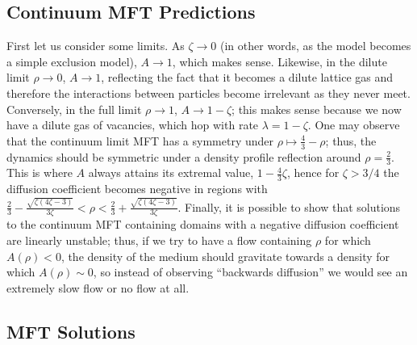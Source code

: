 \subsection{Continuum MFT Predictions} \label{sec:contMFTPred}
First let us consider some limits. As $\zeta \rightarrow 0$ (in other words, as the model becomes a simple exclusion model), $A \rightarrow 1$, which makes sense. Likewise, in the
dilute limit $\rho \rightarrow 0$, $A \rightarrow 1$, reflecting the fact that it becomes a dilute lattice gas and therefore the interactions between particles become irrelevant as they never meet.
Conversely, in the full limit $\rho \rightarrow 1$, $A \rightarrow 1-\zeta$; this makes sense because we now have a dilute gas of vacancies, which hop with rate $\lambda=1-\zeta$.
One may observe that the continuum limit MFT has a symmetry under $\rho \mapsto \frac{4}{3} - \rho$; thus, the dynamics should be symmetric under a density profile reflection around $\rho = \frac{2}{3}$. This is where $A$ always
attains its extremal value, $ 1 - \frac{4}{3}\zeta$, hence for $\zeta>3/4$ the diffusion coefficient becomes negative in regions with
$\frac{2}{3} - \frac{\sqrt{\zeta\left(4\zeta - 3\right)}}{3\zeta} < \rho < \frac{2}{3} + \frac{\sqrt{\zeta\left(4\zeta - 3\right)}}{3\zeta}$.
Finally, it is possible to show that solutions to the continuum MFT containing domains with a negative diffusion coefficient are linearly unstable; thus, if we try to have a flow containing $\rho$ for which $A(\rho)<0$,
the density of the medium should gravitate towards a density for which $A(\rho)\sim 0$, so instead of observing ``backwards diffusion'' we would see an extremely slow flow or no flow at all.
\subsection{MFT Solutions}
